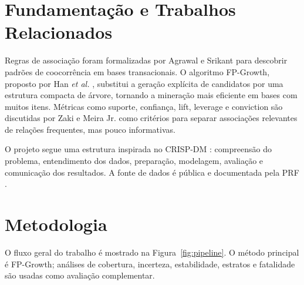\documentclass[12pt]{article}
\begin{document}
\section{Fundamentação e Trabalhos Relacionados}

Regras de associação foram formalizadas por Agrawal e Srikant \cite{agrawal1994} para descobrir padrões de coocorrência em bases transacionais. O algoritmo FP-Growth, proposto por Han \textit{et al.} \cite{han2000}, substitui a geração explícita de candidatos por uma estrutura compacta de árvore, tornando a mineração mais eficiente em bases com muitos itens. Métricas como suporte, confiança, lift, leverage e conviction são discutidas por Zaki e Meira Jr. \cite{zaki2020} como critérios para separar associações relevantes de relações frequentes, mas pouco informativas.

O projeto segue uma estrutura inspirada no CRISP-DM \cite{wirth2000}: compreensão do problema, entendimento dos dados, preparação, modelagem, avaliação e comunicação dos resultados. A fonte de dados é pública e documentada pela PRF \cite{prf2026}.

\section{Metodologia}

O fluxo geral do trabalho é mostrado na Figura~\ref{fig:pipeline}. O método principal é FP-Growth; análises de cobertura, incerteza, estabilidade, estratos e fatalidade são usadas como avaliação complementar.
\end{document}
